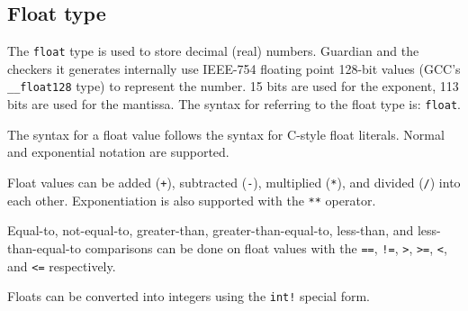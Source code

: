 
\subsection{Float type}
{
	The \texttt{float} type is used to store decimal (real) numbers.
	Guardian and the checkers it generates internally
	use IEEE-754 floating point
	128-bit values (GCC's \texttt{\_\_float128} type) to represent the number.
	15 bits are used for the exponent, 113 bits are used for the mantissa.
	The syntax for referring to the float type is: \texttt{float}.
	
	The syntax for a float value follows the syntax for C-style float literals.
	Normal and exponential notation are supported.
	
	Float values can be added (\texttt{+}),
	subtracted (\texttt{-}), multiplied (\texttt{*}), and
	divided (\texttt{/}) into each
	other. Exponentiation is also supported
	with the \texttt{**} operator.
	
	Equal-to, not-equal-to, greater-than, greater-than-equal-to,
	less-than, and less-than-equal-to comparisons can
	be done on float values with
	the \texttt{==}, \texttt{!=},
	\texttt{>}, \texttt{>=}, \texttt{<}, and \texttt{<=} respectively.
	
	Floats can be converted into integers using
	the \texttt{int!}
	special form.
}
